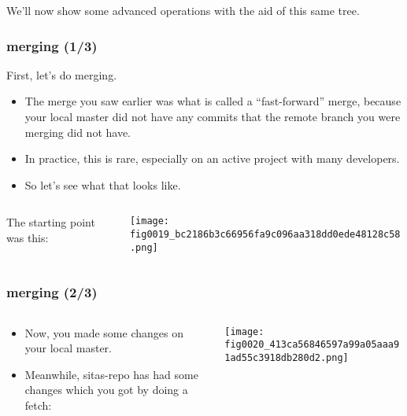 \documentclass[presentation]{beamer}
\begin{document}
We'll now show some advanced operations with the aid of this same tree.
\begin{frame}
\frametitle{merging (1/3)}
\label{sec-8-1}


First, let's do merging.  


\begin{itemize}
\item The merge you saw earlier was what is called a
  ``fast-forward'' merge, because your local master did not have any commits that
  the remote branch you were merging did not have.
\item In practice, this is rare, especially on an active project with many
  developers.
\item So let's see what that looks like.
\end{itemize}
\end{frame}
\begin{frame}
\begin{columns}
\begin{column}{0.4\textwidth}
\label{sec-8-2-1}

The starting point was this:
\end{column}
\begin{column}{0.6\textwidth}
\label{sec-8-2-2}


\texttt{[image: fig0019\_bc2186b3c66956fa9c096aa318dd0ede48128c58.png]}
\end{column}
\end{columns}
\end{frame}
\begin{frame}
\frametitle{merging (2/3)}
\label{sec-8-3}
\begin{columns}
\begin{column}{0.4\textwidth}
\label{sec-8-3-1}

\begin{itemize}
\item Now, you made some changes on your local master.
\item Meanwhile, sitas-repo has
  had some changes which you got by doing a fetch:
\end{itemize}
\end{column}
\begin{column}{0.6\textwidth}
\label{sec-8-3-2}



\texttt{[image: fig0020\_413ca56846597a99a05aaa91ad55c3918db280d2.png]}
\end{column}
\end{columns}
\end{frame}
\end{document}

